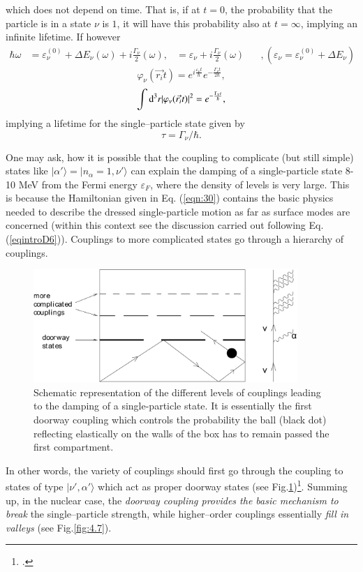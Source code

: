 \noindent which does not depend on time. That is, if at $t=0$, the probability that the particle is in a state $\nu$ is $1$, it will have this probability also at $t=\infty$, implying an infinite lifetime. If however
\begin{eqnarray}
\nonumber
\hbar\omega &= \varepsilon_{\nu}^{(0)} + \Delta E_{\nu}(\omega) + i \frac{\Gamma_\nu}{2} (\omega),
\nonumber
&= \varepsilon_{\nu} + i \frac{\Gamma_{\nu}}{2}(\omega) \;\;\;\;\;\; , (\varepsilon_{\nu} = \varepsilon_{\nu}^{(0)} + \Delta E_{\nu})
\end{eqnarray}
\begin{equation}
\nonumber
\varphi_{\nu}(\vec{r_i} t) = e^{i \frac{\varepsilon_{\nu} t}{\hbar}} e^{- \frac{\Gamma_{\nu} t}{2\hbar}} ,
\end{equation}
\begin{equation}
\int{\rm d}^3 r |\varphi_{\nu} (\vec{r_i} t)|^2 = e^{- \frac{\Gamma_{\nu} t}{\hbar}} ,
\label{eqn:44b}
\end{equation}
implying a lifetime for the single--particle state given by
\begin{equation}
\tau = \Gamma_\nu/\hbar .
\label{eqn:45}
\end{equation}

One may ask, how it is possible that the coupling to complicate (but still simple) states like $|\alpha'\rangle = |n_\alpha = 1,\nu'\rangle$ can explain the  damping of a single-particle state 8-10 MeV from the Fermi energy $\varepsilon_F$, where the density of levels  is very large. This is because the Hamiltonian given in Eq. (\ref{eqn:30}) contains  the basic physics needed to describe the dressed single-particle motion as far as surface modes are concerned (within this context see the discussion carried out following Eq. (\ref{eqintroD6})). Couplings to more complicated states  go through a hierarchy of couplings.
\begin{figure}[h!]
\centerline {
\includegraphics*[width=10cm]{introduccion/figs/figintroD6}
}
\caption{Schematic representation of the different levels of couplings leading to the damping of a single-particle state. It is essentially the first doorway coupling which controls the probability the ball (black dot) reflecting elastically on the walls of the box has to remain passed the first compartment.}
\label{fig:4.6}
\end{figure}
In other words, the variety of couplings  should first go  through the coupling to states of type $|\nu',\alpha'\rangle$ which act as proper doorway states (see Fig.\ref{fig:4.6})\footnote{\cite{Feshbach:58}.}. Summing up, in  the nuclear case, the {\it doorway coupling provides the basic mechanism to break}  the single--particle strength, while higher--order couplings essentially  {\it fill in valleys} (see Fig.\ref{fig:4.7}).

